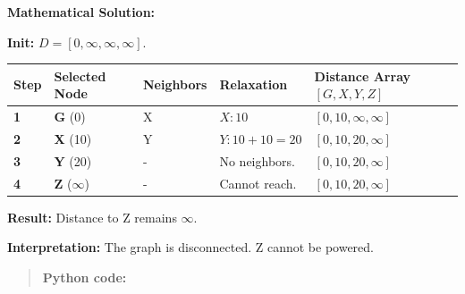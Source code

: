 \documentclass[
  letterpaper,
  DIV=11,
  numbers=noendperiod]{scrreprt}
\begin{document}
\textbf{Mathematical Solution:}

\textbf{Init:} \(D=[0, \infty, \infty, \infty]\).

\begin{longtable}[]{@{}
  >{\raggedright\arraybackslash}p{}
  >{\raggedright\arraybackslash}p{}
  >{\raggedright\arraybackslash}p{}
  >{\raggedright\arraybackslash}p{}
  >{\raggedright\arraybackslash}p{}@{}}
\toprule\noalign{}
\begin{minipage}[b]{\linewidth}\raggedright
Step
\end{minipage} & \begin{minipage}[b]{\linewidth}\raggedright
Selected Node
\end{minipage} & \begin{minipage}[b]{\linewidth}\raggedright
Neighbors
\end{minipage} & \begin{minipage}[b]{\linewidth}\raggedright
Relaxation
\end{minipage} & \begin{minipage}[b]{\linewidth}\raggedright
Distance Array \([G, X, Y, Z]\)
\end{minipage} \\
\midrule\noalign{}
\endhead
\bottomrule\noalign{}
\endlastfoot
\textbf{1} & \textbf{G} (0) & X & \(X: 10\) &
\([0, 10, \infty, \infty]\) \\
\textbf{2} & \textbf{X} (10) & Y & \(Y: 10+10=20\) &
\([0, 10, 20, \infty]\) \\
\textbf{3} & \textbf{Y} (20) & - & No neighbors. &
\([0, 10, 20, \infty]\) \\
\textbf{4} & \textbf{Z} (\(\infty\)) & - & Cannot reach. &
\([0, 10, 20, \mathbf{\infty}]\) \\
\end{longtable}

\textbf{Result:} Distance to Z remains \(\infty\).

\textbf{Interpretation:} The graph is disconnected. Z cannot be powered.

\begin{quote}
\textbf{Python code:}
\end{quote}
\end{document}
